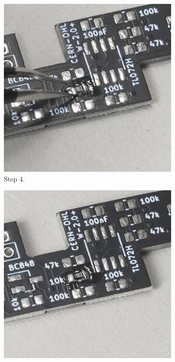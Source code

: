 \documentclass[12pt, a4paper]{article}
\begin{document}
\begin{figure}[H]
    \centering
    \begin{subfigure}{0.3\textwidth}
        \includegraphics[width=\textwidth]{images/02_04_component_soldered_tweezers.jpg}
        \caption*{Step 4.}
    \end{subfigure}
    \hspace{2mm}
    \begin{subfigure}{0.3\textwidth}
        \includegraphics[width=\textwidth]{images/02_05_component_fully_soldered.jpg}

\end{subfigure}
\end{figure}
\end{document}
